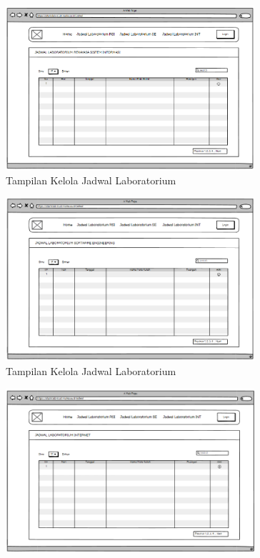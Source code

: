 \begin{enumerate}
	      \begin{figure}
		      \centering
		      \includegraphics[width=0.82\textwidth]{konten/gambar/user interface/ui-jadwal-rsi.png}
		      \caption{Tampilan Kelola Jadwal Laboratorium}
		      \label{fig:jadwal}
	      \end{figure}
	      \begin{figure}
		      \centering
		      \includegraphics[width=0.82\textwidth]{konten/gambar/user interface/ui-jadwal-se.png}
		      \caption{Tampilan Kelola Jadwal Laboratorium}
		      \label{fig:jadwal}
	      \end{figure}
	      \begin{figure}
		      \centering
		      \includegraphics[width=0.82\textwidth]{konten/gambar/user interface/ui-jadwal-int.png}

\end{figure}
\end{enumerate}
